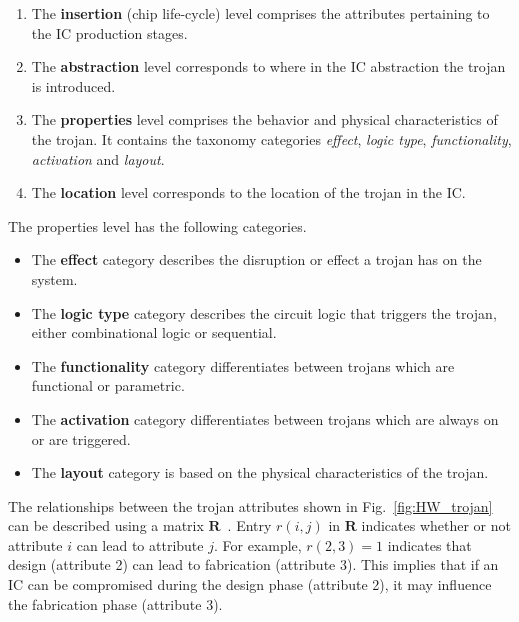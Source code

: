 \documentclass[journal, hidelinks]{IEEEtran}
\begin{document}
\begin{enumerate}
	\item The \textbf{insertion} (chip life-cycle) level comprises the attributes pertaining to the IC production stages.
	\item The \textbf{abstraction} level corresponds to where in the IC abstraction the trojan is introduced.
	\item The \textbf{properties} level comprises the behavior and physical characteristics of the trojan.
	It contains the taxonomy categories \textit{effect}, \textit{logic type}, \textit{functionality}, \textit{activation} and \textit{layout}.
	\item The \textbf{location} level corresponds to the location of the trojan in the IC.
\end{enumerate}

The properties level has the following categories.
\begin{itemize}
	\item The \textbf{effect} category describes the disruption or effect a trojan has on the system.
	\item The \textbf{logic type} category describes the circuit logic that triggers the trojan, either combinational logic or sequential.
	\item The \textbf{functionality} category differentiates between trojans which are functional or parametric.
	\item The \textbf{activation} category differentiates between trojans which are always on or are triggered.
	\item The \textbf{layout} category is based on the physical characteristics of the trojan.
\end{itemize}
The relationships between the trojan attributes shown in Fig.~\ref{fig:HW_trojan} can be described using a matrix $\mathbf{R}$~\cite{samerAttribute}.
Entry $r(i,j)$ in $\mathbf{R}$ indicates whether or not attribute $i$ can lead to attribute $j$.
For example, $r(2,3) = 1$ indicates that design (attribute 2) can lead to fabrication (attribute 3).
This implies that if an IC can be compromised during the design phase (attribute 2), it may influence the fabrication phase (attribute 3).
\end{document}
